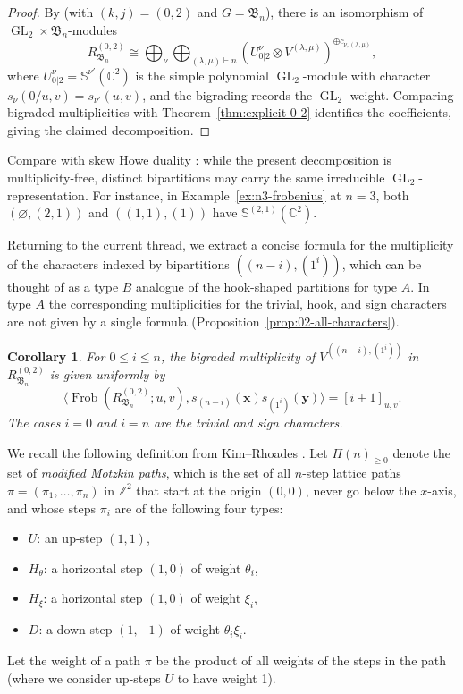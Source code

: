 \documentclass[12pt]{amsart}
\theoremstyle{plain}
\newtheorem{corollary}[theorem]{Corollary}
\theoremstyle{definition}
\DeclareMathOperator{\Frob}{Frob}
\DeclareMathOperator{\GL}{GL}
\newcommand{\C}{\mathbb{C}}
\newcommand{\x}{\mathbf{x}}
\newcommand{\y}{\mathbf{y}}
\begin{document}
\begin{proof}
    By \cite[Theorem 1.1]{Lentfer-Supersymmetry} (with $(k,j) = (0,2)$ and $G = \mathfrak{B}_n$), there is an isomorphism of $\GL_2 \times \mathfrak{B}_n$-modules
    \begin{equation}
        R_{\mathfrak{B}_n}^{(0,2)} \cong \bigoplus_{\nu} \bigoplus_{(\lambda,\mu) \vdash n} \left(U^\nu_{0|2} \otimes V^{(\lambda, \mu)}\right)^{\oplus c_{\nu,(\lambda,\mu)}},
    \end{equation}
    where $U^\nu_{0|2} = \mathbb{S}^{\nu'}(\C^2)$ is the simple polynomial $\GL_2$-module with character $s_\nu(0/u,v) = s_{\nu'}(u,v)$, and the bigrading records the $\GL_2$-weight.
    Comparing bigraded multiplicities with Theorem~\ref{thm:explicit-0-2} identifies the coefficients, giving the claimed decomposition.
\end{proof}
Compare with skew Howe duality \cite{Howe}: while the present decomposition is multiplicity-free, distinct bipartitions may carry the same irreducible $\GL_2$-representation. 
For instance, in Example~\ref{ex:n3-frobenius} at $n=3$, both $(\varnothing,(2,1))$ and $((1,1),(1))$ have $\mathbb{S}^{(2,1)}(\C^2)$.

Returning to the current thread, we extract a concise formula for the multiplicity of the characters indexed by bipartitions $((n-i),(1^i))$, which can be thought of as a type $B$ analogue of the hook-shaped partitions for type $A$.
In type $A$ the corresponding multiplicities for the trivial, hook, and sign characters are not given by a single formula (Proposition~\ref{prop:02-all-characters}).

\begin{corollary}\label{cor:typeB-hooks}
    For $0 \leq i \leq n$, the bigraded multiplicity of $V^{((n-i),(1^i))}$ in $R_{\mathfrak{B}_n}^{(0,2)}$ is given uniformly by
    \begin{equation}
        \langle \Frob(R_{\mathfrak{B}_n}^{(0,2)};u,v),s_{(n-i)}(\x) s_{(1^i)}(\y) \rangle = [i+1]_{u,v}.
    \end{equation}
    The cases $i=0$ and $i=n$ are the trivial and sign characters.
\end{corollary}

We recall the following definition from Kim--Rhoades \cite{MR4381935}. Let $\Pi(n)_{\geq 0}$ denote the set of \emph{modified Motzkin paths}, which is the set of all $n$-step lattice paths $\pi = (\pi_1,\ldots,\pi_n)$ in $\mathbb{Z}^2$ that start at the origin $(0,0)$, never go below the $x$-axis, and whose steps $\pi_i$ are of the following four types:
\begin{itemize}
    \item $U$: an up-step $(1,1)$,
    \item $H_\theta$: a horizontal step $(1,0)$ of weight $\theta_i$,
    \item $H_\xi$: a horizontal step $(1,0)$ of weight $\xi_i$,
    \item $D$: a down-step $(1,-1)$ of weight $\theta_i\xi_i$.
\end{itemize}
Let the weight of a path $\pi$ be the product of all weights of the steps in the path (where we consider up-steps $U$ to have weight 1).
\end{document}
